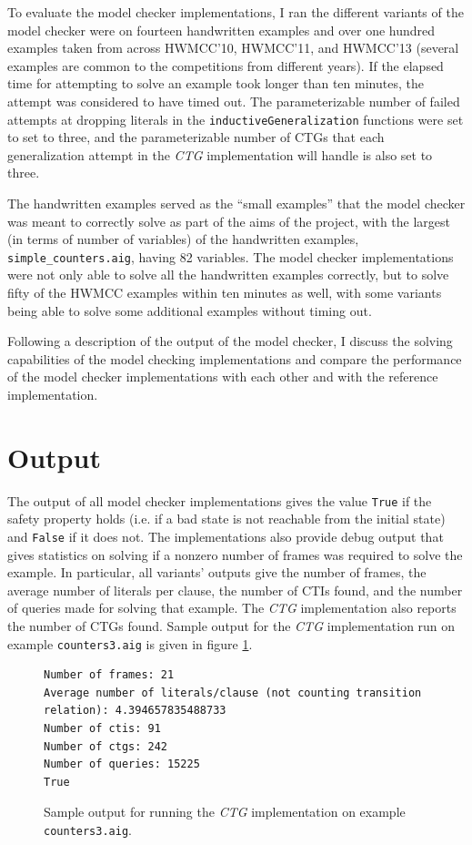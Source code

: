 \documentclass[12pt,a4paper,twoside,openright]{report}
\begin{document}
{To evaluate the model checker implementations, I ran the different variants of the model
checker were on fourteen handwritten examples and over one hundred examples taken from
across HWMCC'10, HWMCC'11, and HWMCC'13
(several examples are common to the competitions from different years).
If the elapsed time for attempting to solve an example took longer than ten minutes, the
attempt was considered to have timed out. The parameterizable number of failed attempts
at dropping literals in the \verb,inductiveGeneralization, functions were set to set to
three, and the parameterizable number of CTGs that each generalization attempt
in the {\it CTG} implementation will handle is also set to three.

The handwritten examples served as the ``small examples'' that the model checker
was meant to correctly solve as part of the aims of the project, with the largest
(in terms of number of variables) of the handwritten examples,
\verb,simple_counters.aig,, having 82 variables. The model checker
implementations were not only able to solve all the handwritten examples correctly,
but to solve fifty of the HWMCC examples within ten minutes as well, with some
variants being able to solve some additional examples without timing out.

Following a description of the output of the model checker,
I discuss the solving capabilities of the model checking implementations and compare
the performance of the model checker implementations with each other
and with the reference implementation.


\section{Output}

The output of all model checker implementations gives the value \verb,True, if the safety
property holds (i.e. if a bad state is not reachable from the initial state) and
\verb,False, if it does not. The implementations also provide debug output that gives
statistics on solving if a nonzero number of frames was required to solve the example.
In particular, all variants' outputs give the number of frames, the average number of
literals per clause, the number of CTIs found, and the number of queries made for solving
that example. The {\it CTG} implementation also reports the number of CTGs found. Sample output
for the {\it CTG} implementation run on example \verb,counters3.aig,
is given in figure \ref{sampleoutput}.

\begin{figure}[!ht]
\centering
\begin{lstlisting}
Number of frames: 21
Average number of literals/clause (not counting transition relation): 4.394657835488733
Number of ctis: 91
Number of ctgs: 242
Number of queries: 15225
True
\end{lstlisting}
\caption{Sample output for running the {\it CTG} implementation on example {\tt counters3.aig}.}
\label{sampleoutput}
\end{figure}

}
\end{document}
